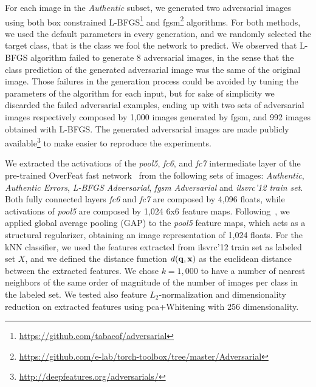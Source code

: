For each image in the \emph{Authentic} subset, we generated two adversarial images using both box constrained L-BFGS\footnote{\url{https://github.com/tabacof/adversarial}} and \gls{fgsm}\footnote{\url{https://github.com/e-lab/torch-toolbox/tree/master/Adversarial}} algorithms.
For both methods, we used the default parameters in every generation, and we randomly selected the target class, that is the class we fool the network to predict.
We observed that L-BFGS algorithm failed to generate 8 adversarial images, in the sense that the class prediction of the generated adversarial image was the same of the original image.
Those failures in the generation process could be avoided by tuning the parameters of the algorithm for each input, but for sake of simplicity we discarded the failed adversarial examples, ending up with two sets of adversarial images respectively composed by 1,000 images generated by \gls{fgsm}, and 992 images obtained with L-BFGS.
The generated adversarial images are made publicly available\footnote{\url{http://deepfeatures.org/adversarials/}} to make easier to reproduce the experiments.

We extracted the activations of the \emph{pool5}, \emph{fc6}, and \emph{fc7} intermediate layer of the pre-trained OverFeat fast network~\cite{sermanet2013overfeat} from the following sets of images: \emph{Authentic}, \emph{Authentic Errors}, \emph{L-BFGS Adversarial}, \emph{\gls{fgsm} Adversarial} and \emph{\gls{ilsvrc}'12 train set}.
Both fully connected layers \emph{fc6} and \emph{fc7} are composed by 4,096 floats, while activations of \emph{pool5} are composed by 1,024 6x6 feature maps.
Following~\cite{simonyan2014very}, we applied global average pooling (GAP) to the \emph{pool5} feature maps, which acts as a structural regularizer, obtaining an image representation of 1,024 floats.
For the kNN classifier, we used the features extracted from \gls{ilsvrc}'12 train set as labeled set $X$, and we defined the distance function $d(\mathbf{q},\mathbf{x})$ as the euclidean distance between the extracted features.
We chose $k=1,000$ to have a number of nearest neighbors of the same order of magnitude of the number of images per class in the labeled set. %
We tested also feature $L_2$-normalization and dimensionality reduction on extracted features using \gls{pca}+Whitening with 256 dimensionality.

